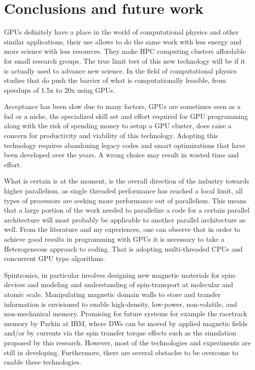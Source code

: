 
\chapter{Conclusions and future work} %

\label{Conclusions and future work} %


GPUs definitely have a place in the world of computational physics and other similar applications, their use allows to do the same work with less energy and more science with less resources. They make HPC computing clusters affordable for small research groups. The true limit test of this new technology will be if it is actually used to advance new science. In the field of computational physics studies that do push the barrier of what is computationally feasible, from speedups of 1.5x to 20x using GPUs\cite{applications}.

Acceptance has been slow due to many factors, GPUs are sometimes seen as a fad or a niche, the specialized skill set and effort required for GPU programming along with the risk of spending money to setup a GPU cluster, does raise a concern for productivity and viability of this technology. Adopting this technology requires abandoning legacy codes and smart optimizations that have been developed over the years. A wrong choice may result in wasted time and effort.

What is certain is at the moment, is the overall direction of the industry towards higher parallelism, as single threaded performance has reached a local limit, all types of processors are seeking more performance out of parallelism. This means that a large portion of the work needed to parallelize a code for a certain parallel architecture will most probably be applicable to another parallel architecture as well. From the literature and my experiences, one can observe that in order to achieve good results in programming with GPUs it is necessary to take a Heterogeneous approach to coding. That is adopting multi-threaded CPUs and concurrent GPU type algorithms.

Spintronics, in particular involves designing new magnetic materials for spin-devices and modeling and understanding of spin-transport at molecular and atomic scale. Manipulating magnetic domain walls to store and transfer information is envisioned to enable high-density, low-power, non-volatile, and non-mechanical memory. Promising for future systems for example the racetrack memory by Parkin at IBM, where DWs can be moved by applied magnetic fields and/or by currents via the spin transfer torque effects such as the simulation proposed by this research. However, most of the technologies and experiments  are still in developing. Furthermore, there are several obstacles to be overcome to enable these technologies.

